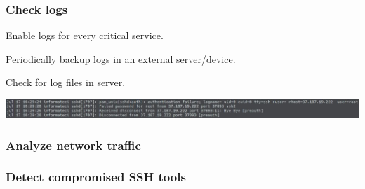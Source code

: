 \begin{frame}
	\frametitle{Check logs}
	
	Enable logs for every critical service.

	\smallskip

  Periodically backup logs in an external server/device.

	\smallskip
	
	Check for log files in server.

	\smallskip
	
  \begin{center}    
  \includegraphics[width=1\textwidth]{images/ssh_log}
  \end{center}

\end{frame}

\begin{frame}
	\frametitle{Analyze network traffic}
\end{frame}

\begin{frame}
	\frametitle{Detect compromised SSH tools}
\end{frame}

